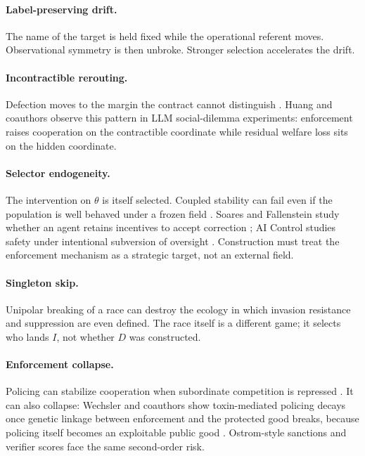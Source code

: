 \documentclass[11pt]{article}
\begin{document}
\paragraph{Label-preserving drift.}
The name of the target is held fixed while the operational referent moves. Observational symmetry is then unbroke. Stronger selection accelerates the drift.

\paragraph{Incontractible rerouting.}
Defection moves to the margin the contract cannot distinguish \parencite{huang2026}. Huang and coauthors observe this pattern in LLM social-dilemma experiments: enforcement raises cooperation on the contractible coordinate while residual welfare loss sits on the hidden coordinate.

\paragraph{Selector endogeneity.}
The intervention on \(\theta\) is itself selected. 
Coupled stability can fail even if the population is well behaved under a frozen field \parencite{zarncke2026selection}. 
Soares and Fallenstein study whether an agent retains incentives to accept correction \parencite{soares2015corrigibility}; AI Control studies safety under intentional subversion of oversight \parencite{shlegeris2023aicontrol}. 
Construction must treat the enforcement mechanism as a strategic target, not an external field.

\paragraph{Singleton skip.}
Unipolar breaking of a race can destroy the ecology in which invasion resistance and suppression are even defined. The race itself is a different game; it selects who lands \(I\), not whether \(D\) was constructed.

\paragraph{Enforcement collapse.}
Policing can stabilize cooperation when subordinate competition is repressed \parencite{frank1995}. 
It can also collapse: Wechsler and coauthors show toxin-mediated policing decays once genetic linkage between enforcement and the protected good breaks, because policing itself becomes an exploitable public good \parencite{wechsler2019}. Ostrom-style sanctions and verifier scores face the same second-order risk.
\end{document}
